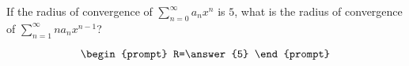 \documentclass{ximera}
\author{Gregory Hartman \and Matthew Carr}
\begin{document}
\begin{exercise}




If the radius of convergence of $\sum_{n=0}^\infty a_nx^n$ is $5$, what is the radius of convergence of $\sum_{n=1}^\infty n a_nx^{n-1}$?

\[
\begin{prompt}
R=\answer{5}
\end{prompt}
\]

\end{exercise}
\end{document}
